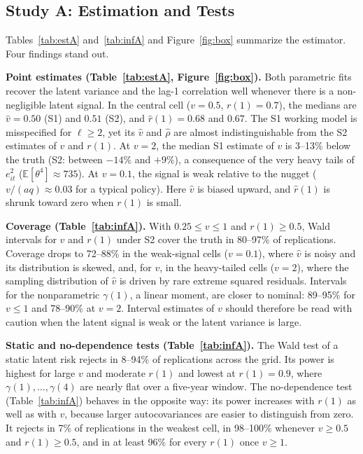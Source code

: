 \documentclass[mathematics,article,submit,moreauthors]{Definitions/mdpi}
\newcommand{\E}{\mathbb{E}}
\begin{document}
\subsection{Study A: Estimation and Tests}

Tables~\ref{tab:estA} and~\ref{tab:infA} and Figure~\ref{fig:box} summarize the estimator. Four findings stand out.

\textbf{Point estimates (Table~\ref{tab:estA}, Figure~\ref{fig:box}).} Both parametric fits recover the latent variance and the lag-1 correlation well whenever there is a non-negligible latent signal. In the central cell ($v=0.5$, $r(1)=0.7$), the medians are $\hat v=0.50$ (S1) and $0.51$ (S2), and $\hat r(1)=0.68$ and $0.67$. The S1 working model is misspecified for $\ell\ge2$, yet its $\hat v$ and $\hat\rho$ are almost indistinguishable from the S2 estimates of $v$ and $r(1)$. At $v=2$, the median S1 estimate of $v$ is 3--13\% below the truth (S2: between $-14\%$ and $+9\%$), a consequence of the very heavy tails of $e_{it}^2$ ($\E[\theta^4]\approx735$). At $v=0.1$, the signal is weak relative to the nugget ($v/(aq)\approx0.03$ for a typical policy). Here $\hat v$ is biased upward, and $\hat r(1)$ is shrunk toward zero when $r(1)$ is small.

\textbf{Coverage (Table~\ref{tab:infA}).} With $0.25\le v\le1$ and $r(1)\ge0.5$, Wald intervals for $v$ and $r(1)$ under S2 cover the truth in 80--97\% of replications. Coverage drops to 72--88\% in the weak-signal cells ($v=0.1$), where $\hat v$ is noisy and its distribution is skewed, and, for $v$, in the heavy-tailed cells ($v=2$), where the sampling distribution of $\hat v$ is driven by rare extreme squared residuals. Intervals for the nonparametric $\gamma(1)$, a linear moment, are closer to nominal: 89--95\% for $v\le1$ and 78--90\% at $v=2$. Interval estimates of $v$ should therefore be read with caution when the latent signal is weak or the latent variance is large.

\textbf{Static and no-dependence tests (Table~\ref{tab:infA}).} The Wald test of a static latent risk rejects in 8--94\% of replications across the grid. Its power is highest for large $v$ and moderate $r(1)$ and lowest at $r(1)=0.9$, where $\gamma(1),\dots,\gamma(4)$ are nearly flat over a five-year window. The no-dependence test (Table~\ref{tab:infA}) behaves in the opposite way: its power increases with $r(1)$ as well as with $v$, because larger autocovariances are easier to distinguish from zero. It rejects in 7\% of replications in the weakest cell, in 98--100\% whenever $v\ge0.5$ and $r(1)\ge0.5$, and in at least 96\% for every $r(1)$ once $v\ge1$.
\end{document}
